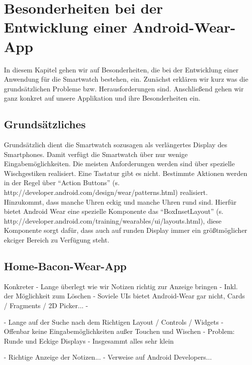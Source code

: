 \section{Besonderheiten bei der Entwicklung einer Android-Wear-App}
In diesem Kapitel gehen wir auf Besonderheiten, die bei der Entwicklung einer Anwendung für die Smartwatch bestehen, ein. Zunächst erklären wir kurz was die grundsätzlichen Probleme bzw. Herausforderungen sind. Anschließend gehen wir ganz konkret auf unsere Applikation und ihre Besonderheiten ein.

\subsection{Grundsätzliches}
Grundsätzlich dient die Smartwatch sozusagen als verlängertes Display des Smartphones. Damit verfügt die Smartwatch über nur wenige Eingabemöglichkeiten. Die meisten Anforderungen werden sind über spezielle Wischgestiken realisiert. Eine Tastatur gibt es nicht. Bestimmte Aktionen werden in der Regel über "`Action Buttons"' (s. http://developer.android.com/design/wear/patterns.html) realisiert. Hinzukommt, dass manche Uhren eckig und manche Uhren rund sind. Hierfür bietet Android Wear eine spezielle Komponente das "`BoxInsetLayout"' (s. http://developer.android.com/training/wearables/ui/layouts.html), diese Komponente sorgt dafür, dass auch auf runden Display immer ein größtmöglicher ekciger Bereich zu Verfügung steht.

\subsection{Home-Bacon-Wear-App}


Konkreter
	- Lange überlegt wie wir Notizen richtig zur Anzeige bringen
		- Inkl. der Möglichkeit zum Löschen
	- Soviele UIs bietet Android-Wear gar nicht, Cards / Fragments / 2D Picker...
	- 

- Lange auf der Suche nach dem Richtigen Layout / Controls / Widgets
- Offenbar keine Eingabemöglichkeiten außer Touchen und Wischen
- Problem: Runde und Eckige Displays
- Insgesammt alles sehr klein

- Richtige Anzeige der Notizen...
- Verweise auf Android Developers...